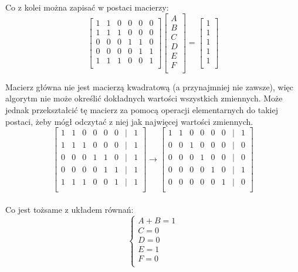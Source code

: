 \documentclass{article} %
\begin{document}
Co z kolei można zapisać w postaci macierzy: \\

\[
\begin{bmatrix}
    1 & 1 & 0 & 0 & 0 & 0 \\
    1 & 1 & 1 & 0 & 0 & 0 \\
    0 & 0 & 0 & 1 & 1 & 0 \\
    0 & 0 & 0 & 0 & 1 & 1 \\
    1 & 1 & 1 & 0 & 0 & 1 \\
\end{bmatrix}
\begin{bmatrix}
    A \\ B \\ C \\ D \\ E \\ F\\
\end{bmatrix}
=
\begin{bmatrix}
    1 \\ 1 \\ 1 \\ 1 \\ 1 \\
\end{bmatrix}
\]

Macierz główna nie jest macierzą kwadratową (a przynajmniej nie zawsze), 
więc algorytm nie może określić dokładnych wartości wszystkich zmiennych. Może jednak 
przekształcić tę macierz za pomocą operacji elementarnych do takiej postaci, żeby
mógł odczytać z niej jak najwięcej wartości zmiennych. 
\[
\begin{bmatrix}
    1 & 1 & 0 & 0 & 0 & 0 & | & 1\\
    1 & 1 & 1 & 0 & 0 & 0 & | & 1\\
    0 & 0 & 0 & 1 & 1 & 0 & | & 1 \\
    0 & 0 & 0 & 0 & 1 & 1 & | & 1\\
    1 & 1 & 1 & 0 & 0 & 1 & | & 1\\
\end{bmatrix}
\longrightarrow
\begin{bmatrix}
    1 & 1 & 0 & 0 & 0 & 0 & | & 1\\
    0 & 0 & 1 & 0 & 0 & 0 & | & 0\\
    0 & 0 & 0 & 1 & 0 & 0 & | & 0 \\
    0 & 0 & 0 & 0 & 1 & 0 & | & 1\\
    0 & 0 & 0 & 0 & 0 & 1 & | & 0\\
\end{bmatrix}
\] \\
Co jest tożsame z układem równań:\\
$$
\begin{cases}
 A + B = 1 \\
 C = 0 \\
 D = 0 \\
 E = 1 \\
 F = 0 \\
\end{cases}
$$
\end{document}
